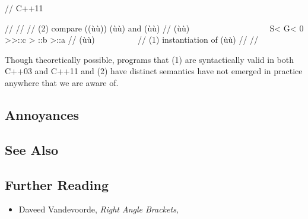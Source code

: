 \begin{emcppslisting}[emcppsignore={Pathological}]
// C++11

//
//
//  (2) compare ((ù{\codeincomments{>}}ù)) (ù{}ù) and (ù{}ù)
//  (ù{\codeincomments{$\downarrow$}}ù) ~~~~~~~~~~~~~~~~~~
    S< G< 0 >>::c > ::b >::a
//  (ù{\codeincomments{$\uparrow$}}ù) ~~~~~~~~~
//  (1) instantiation of (ù{}ù)
//
//
\end{emcppslisting}

\noindent Though theoretically possible, programs that (1) are syntactically valid
in both C++03 and C++11 and (2) have distinct semantics have not
emerged in practice anywhere that we are aware of.

\subsection[Annoyances]{Annoyances}\label{annoyances}

\hspace{\fill}

\subsection[See Also]{See Also}\label{see-also}

\hspace{\fill}

\subsection[Further Reading]{Further Reading}\label{further-reading}

\begin{itemize}
\item{Daveed Vandevoorde, \textit{Right Angle Brackets,} \cite{vandevoorde05}}
\end{itemize}


